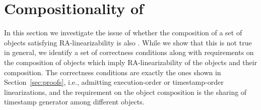 
\section{Compositionality of \CRDTLin{}}
\label{sec:compositionality}




In this section we investigate the issue of whether the composition of a set of objects satisfying RA-linearizability is also \crdtlinearizable{}. While we show that this is not true in general, we identify a set of correctness conditions along with requirements on the composition of objects which imply RA-linearizability of the objects and their composition. The correctness conditions are exactly the ones shown in Section~\ref{sec:proofs}, i.e., admitting execution-order or timestamp-order linearizations, and the requirement on the object composition is the sharing of  timestamp generator among different objects.

